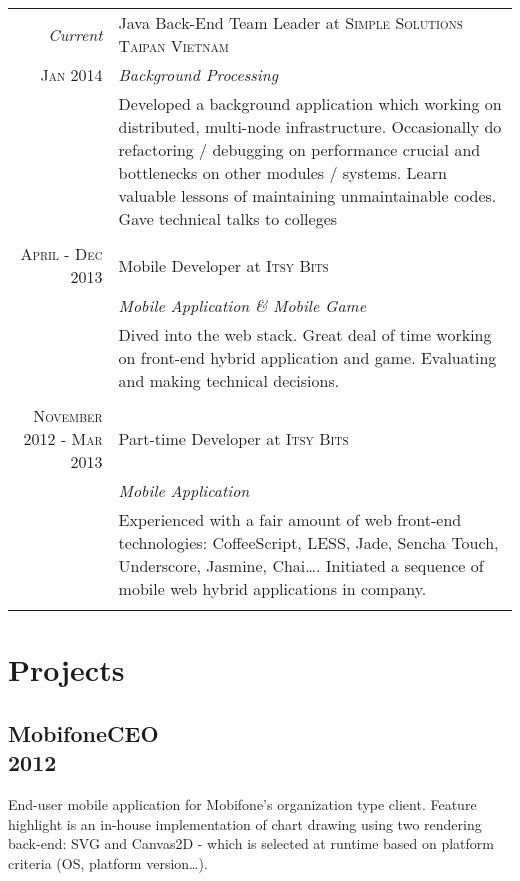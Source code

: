 \documentclass[a4paper,10pt]{article}
\begin{document}
\begin{tabular}{r|p{11cm}}

    \emph{Current} & Java Back-End Team Leader at \textsc{Simple Solutions Taipan Vietnam} \\\textsc{Jan 2014}&\emph{Background Processing}\\&\footnotesize{Developed a background application which working on distributed, multi-node infrastructure. Occasionally do refactoring / debugging on performance crucial and bottlenecks on other modules / systems. Learn valuable lessons of maintaining unmaintainable codes. Gave technical talks to colleges}\\\multicolumn{2}{c}{} \\

    \textsc{April - Dec 2013 } & Mobile Developer at \textsc{Itsy Bits} \\&\emph{Mobile Application \& Mobile Game}\\&\footnotesize{Dived into the web stack. Great deal of time working on front-end hybrid application and game. Evaluating and making technical decisions.}\\\multicolumn{2}{c}{} \\

    \textsc{November 2012 - Mar 2013} & Part-time Developer at \textsc{Itsy Bits} \\&\emph{Mobile Application}\\&\footnotesize{Experienced with a fair amount of web front-end technologies: CoffeeScript, LESS, Jade, Sencha Touch, Underscore, Jasmine, Chai\ldots. Initiated a sequence of mobile web hybrid applications in company.}\\\multicolumn{2}{c}{} \\

\end{tabular}

\section{Projects}


\subsection*{MobifoneCEO\\\small 2012}

End-user mobile application for Mobifone's organization type client. Feature highlight is an in-house implementation of chart drawing using two rendering back-end: SVG and Canvas2D - which is selected at runtime based on platform criteria (OS, platform version\ldots).
\end{document}
